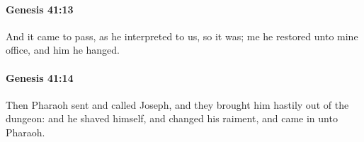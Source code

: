 		\paragraph{Genesis 41:13} %
			\label{GENESIS-41-13}

			And it came to pass, as he interpreted to us, so it was; me he restored unto mine office, and him he hanged.


		\paragraph{Genesis 41:14} %
			\label{GENESIS-41-14}

			Then Pharaoh sent and called Joseph, and they brought him hastily out of the dungeon: and he shaved himself, and changed his raiment, and came in unto Pharaoh.


